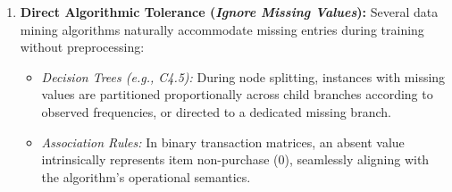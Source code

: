 \begin{enumerate}
    \item \textbf{Direct Algorithmic Tolerance (\textit{Ignore Missing Values}):}
    Several data mining algorithms naturally accommodate missing entries during training without preprocessing:
    \begin{itemize}
        \item \textit{Decision Trees (e.g., C4.5):} During node splitting, instances with missing values are partitioned proportionally across child branches according to observed frequencies, or directed to a dedicated missing branch.
        \item \textit{Association Rules:} In binary transaction matrices, an absent value intrinsically represents item non-purchase ($0$), seamlessly aligning with the algorithm's operational semantics.
    \end{itemize}
\end{enumerate}

